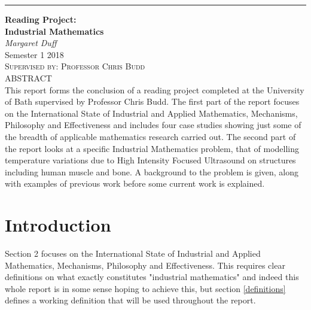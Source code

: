 \documentclass[11pt]{article} %
\begin{document}
	\begin{titlepage} %
		
		\raggedleft %
		
		\rule{1pt}{\textheight} %
		\hspace{0.05\textwidth} %
		\parbox[b]{0.75\textwidth}{ %
			
			{\Huge\bfseries Reading Project: \\[0.5\baselineskip] Industrial Mathematics}\\[2\baselineskip] %
			{\large\textit{Margaret Duff}}\\[3\baselineskip] %
			{\large{Semester 1 2018}}\\[3\baselineskip] %
			{\Large\textsc{Supervised by: Professor Chris Budd}}\\[4\baselineskip] %
			{ABSTRACT}\\[1\baselineskip]
			{This report forms the conclusion of a reading project completed at the University of Bath supervised by Professor Chris Budd. 
				The first part of the report focuses on the International State of Industrial and Applied Mathematics, Mechanisms, Philosophy and Effectiveness and includes four case studies showing just some of the breadth of applicable mathematics research carried out. The second part of the report looks at a specific Industrial Mathematics problem, that of modelling temperature variations due to High Intensity Focused Ultrasound on structures including human muscle and bone. A background to the problem is given, along with examples of previous work before some current work is explained.  }\\[4\baselineskip]			
		}
		
	\end{titlepage}

\pagebreak
	\tableofcontents 
	\pagebreak
	\section{Introduction}
	
	Section 2 focuses on the International State of Industrial and Applied Mathematics, Mechanisms, Philosophy and Effectiveness. This requires clear definitions on what exactly constitutes "industrial mathematics" and indeed this whole report is in some sense hoping to achieve this, but  section \ref{definitions} defines a working definition that will be used throughout the report. 
	
\end{document}
